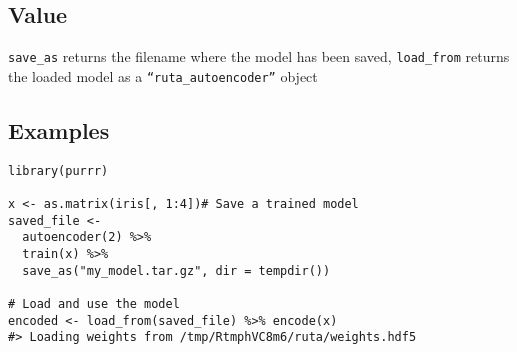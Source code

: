 \hypertarget{value}{\subsection{\texorpdfstring{\protect\hyperlink{value}{}Value}{Value}}\label{value}}

\texttt{save\_as} returns the filename where the model has been saved,
\texttt{load\_from} returns the loaded model as a
\texttt{``ruta\_autoencoder''} object

\hypertarget{examples}{\subsection{\texorpdfstring{\protect\hyperlink{examples}{}Examples}{Examples}}\label{examples}}

\begin{verbatim}
library(purrr)

x <- as.matrix(iris[, 1:4])# Save a trained model
saved_file <-
  autoencoder(2) %>%
  train(x) %>%
  save_as("my_model.tar.gz", dir = tempdir())

# Load and use the model
encoded <- load_from(saved_file) %>% encode(x)
#> Loading weights from /tmp/RtmphVC8m6/ruta/weights.hdf5
\end{verbatim}
